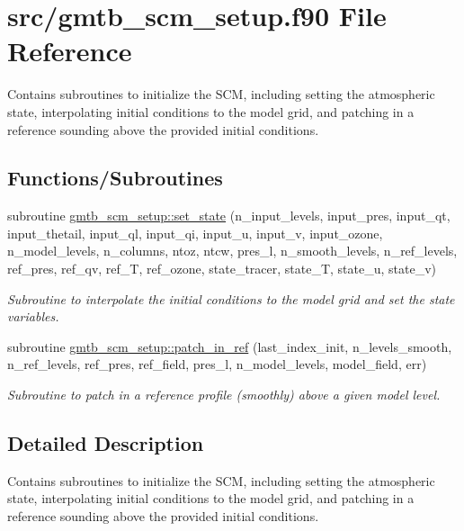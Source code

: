\hypertarget{gmtb__scm__setup_8f90}{}\section{src/gmtb\+\_\+scm\+\_\+setup.f90 File Reference}
\label{gmtb__scm__setup_8f90}


Contains subroutines to initialize the S\+CM, including setting the atmospheric state, interpolating initial conditions to the model grid, and patching in a reference sounding above the provided initial conditions.  


\subsection*{Functions/\+Subroutines}
{\bf }\par
\begin{DoxyCompactItemize}
\item 
subroutine \hyperlink{group__setup_ga7a3fc65081b77cb24cc8fd62f8b57432}{gmtb\+\_\+scm\+\_\+setup\+::set\+\_\+state} (n\+\_\+input\+\_\+levels, input\+\_\+pres, input\+\_\+qt, input\+\_\+thetail, input\+\_\+ql, input\+\_\+qi, input\+\_\+u, input\+\_\+v, input\+\_\+ozone,   n\+\_\+model\+\_\+levels, n\+\_\+columns, ntoz, ntcw, pres\+\_\+l, n\+\_\+smooth\+\_\+levels, n\+\_\+ref\+\_\+levels, ref\+\_\+pres, ref\+\_\+qv, ref\+\_\+T, ref\+\_\+ozone, state\+\_\+tracer,   state\+\_\+T, state\+\_\+u, state\+\_\+v)
\begin{DoxyCompactList}\small\item\em Subroutine to interpolate the initial conditions to the model grid and set the state variables. \end{DoxyCompactList}\end{DoxyCompactItemize}

{\bf }\par
\begin{DoxyCompactItemize}
\item 
subroutine \hyperlink{group__setup_gaee18a724335044e0c91ab74cd01a832c}{gmtb\+\_\+scm\+\_\+setup\+::patch\+\_\+in\+\_\+ref} (last\+\_\+index\+\_\+init, n\+\_\+levels\+\_\+smooth, n\+\_\+ref\+\_\+levels, ref\+\_\+pres, ref\+\_\+field, pres\+\_\+l, n\+\_\+model\+\_\+levels, model\+\_\+field,   err)
\begin{DoxyCompactList}\small\item\em Subroutine to patch in a reference profile (smoothly) above a given model level. \end{DoxyCompactList}\end{DoxyCompactItemize}



\subsection{Detailed Description}
Contains subroutines to initialize the S\+CM, including setting the atmospheric state, interpolating initial conditions to the model grid, and patching in a reference sounding above the provided initial conditions. 

